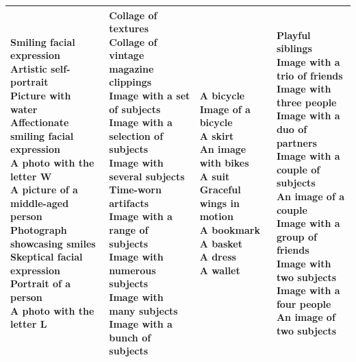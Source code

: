 \documentclass{article}
\begin{document}
\begin{table}[htbp]
\begin{tabular}{|p{4.0cm}|p{4.0cm}|p{4.0cm}|p{4.0cm}|}
\hline
\makecell[t]{Smiling facial expression \\ Artistic self-portrait \\ Picture with water \\ Affectionate smiling facial expression \\ A photo with the letter W \\ A picture of a middle-aged person \\ Photograph showcasing smiles \\ Skeptical facial expression \\ Portrait of a person \\ A photo with the letter L} & \makecell[t]{Collage of textures \\ Collage of vintage magazine clippings \\ Image with a set of subjects \\ Image with a selection of subjects \\ Image with several subjects \\ Time-worn artifacts \\ Image with a range of subjects \\ Image with numerous subjects \\ Image with many subjects \\ Image with a bunch of subjects} & \makecell[t]{A bicycle \\ Image of a bicycle \\ A skirt \\ An image with bikes \\ A suit \\ Graceful wings in motion \\ A bookmark \\ A basket \\ A dress \\ A wallet} & \makecell[t]{Playful siblings \\ Image with a trio of friends \\ Image with three people \\ Image with a duo of partners \\ Image with a couple of subjects \\ An image of a couple \\ Image with a group of friends \\ Image with two subjects \\ Image with a four people \\ An image of two subjects} \\
\hline

\end{tabular}
\end{table}
\end{document}
